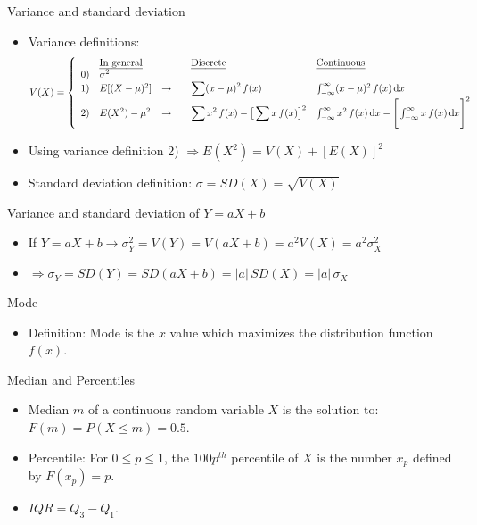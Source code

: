 \documentclass{article}
\newcommand{\integral}[4]{\int_{#1}^{#2} #3 \,\mathrm{d} #4}		%
\begin{document}
Variance and standard deviation
\begin{itemize}
    \item Variance definitions:
    \[
    V(X) =
    \left\{
    \begin{array}{llllll}
        & \text{\ul{In general}} & & & \text{\ul{Discrete}} & \text{\ul{Continuous}} \\
        0) & \sigma^2 & & & & \\
        1) & E[(X  - \mu)^2] & \rightarrow & & \displaystyle \sum (x - \mu)^2 \, f(x) & \integral{-\infty}{\infty}{(x - \mu)^2 \, f(x)}{x} \\
        2) & E(X^2) - \mu^2 & \rightarrow &  & \displaystyle \sum x^2 \, f(x) - \big[\sum x \, f(x)\big]^2 & \integral{-\infty}{\infty}{x^2 \, f(x)}{x} - \Bigg[\integral{-\infty}{\infty}{x \, f(x)}{x}\Bigg]^2 \\
    \end{array}
    \right.
    \]
    \item Using variance definition 2) $\Rightarrow E(X^2) = V(X) + [E(X)]^2$
    \item Standard deviation definition: $\sigma = SD(X) = \sqrt{V(X)}$
\end{itemize}\bigskip

Variance and standard deviation of $Y = aX + b$
\begin{itemize}
    \item If $Y = aX + b \rightarrow \sigma^2_Y = V(Y) = V(aX + b) = a^2 V(X) = a^2 \sigma^2_X$
    \item[] $\Rightarrow \sigma_Y = SD(Y) = SD(aX + b) = \lvert a \rvert \, SD(X) = \lvert a \rvert \, \sigma_X$
\end{itemize}\bigskip

Mode
\begin{itemize}
    \item Definition: Mode is the $x$ value which maximizes the distribution function $f(x)$.
\end{itemize}\bigskip

Median and Percentiles
\begin{itemize}
    \item Median $m$ of a continuous random variable $X$ is the solution to: $F(m) = P(X \le m) = 0.5$.
    \item Percentile: For $0 \le p \le 1$, the $100 p^{th}$ percentile of $X$ is the number $x_p$ defined by $F(x_p) = p$.
    \item $IQR = Q_3 - Q_1$.
\end{itemize}
\end{document}
